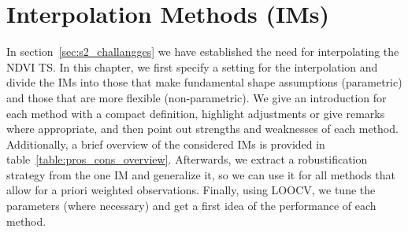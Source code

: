 \newcommand{\RobItPlot}{fitted to different (SCL45) NDVI {TS}. Iterations of a robustifing refit (as indicated in section~\ref{sec:loess_robustify}) are also displayed.}


\chapter{Interpolation Methods ({{IM}}s)} \label{sec:itpl}
	{%
		In section~\ref{sec:s2_challangges} we have established the need for interpolating the NDVI {TS}. In this chapter, we first specify a setting for the interpolation and divide the {{IM}}s into those that make fundamental shape assumptions (parametric) and those that are more flexible (non-parametric). We give an introduction for each method with a compact definition, highlight adjustments or give remarks where appropriate, and then point out strengths and weaknesses of each method. Additionally, a brief overview of the considered {{IM}}s is provided in table~\ref{table:pros_cons_overview}.
		Afterwards, we extract a robustification strategy from the one {{IM}} and generalize it, so we can use it for all methods that allow for a priori weighted observations. Finally, using LOOCV, we tune the parameters (where necessary) and get a first idea of the performance of each method.


	}
	{%
		\footnotesize
		
		\normalsize
	}



